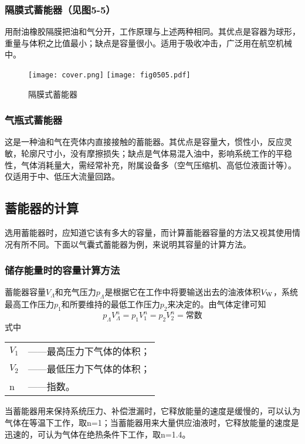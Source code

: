 \subsubsection{隔膜式蓄能器（见图5-5）}

用耐油橡胶隔膜把油和气分开，工作原理与上述两种相同。其优点是容器为球形，重量与体积之比值最小；缺点是容量很小。适用于吸收冲击，广泛用在航空机械中。

\begin{figure}
\centering
\ifOpenSource
\texttt{[image: cover.png]}
\else
\texttt{[image: fig0505.pdf]}
\fi
\caption{隔膜式蓄能器}
\label{fig:fig0505}
\end{figure}

\subsubsection{气瓶式蓄能器}

这是一种油和气在壳体内直接接触的蓄能器。其优点是容量大，惯性小，反应灵敏，轮廓尺寸小，没有摩擦损失；缺点是气体易混入油中，影响系统工作的平稳性，气体消耗量大，需经常补充，附属设备多（空气压缩机、高低位液面计等）。仅适用于中、低压大流量回路。

\subsection{蓄能器的计算}

选用蓄能器时，应知道它该有多大的容量，而计算蓄能器容量的方法又视其使用情况有所不同。下面以气囊式蓄能器为例，来说明其容量的计算方法。

\subsubsection{储存能量时的容量计算方法}

蓄能器容量$V_{\Lambda}$和充气压力$p_{\Lambda}$是根据它在工作中将要输送出去的油液体积$V_{\mbox{\scriptsize W}}$，系统最高工作压力$p_{1}$和所要维持的最低工作压力$p_{2}$来决定的。由气体定律可知
\begin{equation}
p_{\Lambda}V^{n}_{\Lambda}=p_{1}V^{n}_{1}=p_{2}V^{n}_{2}=\mbox{常数}
\end{equation}
式中
\begin{tabular}[t]{ll}
$V_{1}$&——最高压力下气体的体积；\\
$V_{2}$&——最低压力下气体的体积；\\
n&——指数。
\end{tabular}

当蓄能器用来保持系统压力、补偿泄漏时，它释放能量的速度是缓慢的，可以认为气体在等温下工作，取n=1；当蓄能器用来大量供应油液时，它释放能量的速度是迅速的，可认为气体在绝热条件下工作，取n=1.4。

